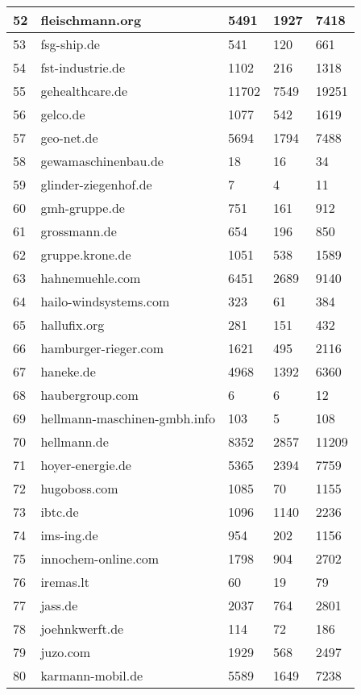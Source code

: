 \begin{longtable}{|m{0.5cm}|m{5cm}|m{2cm}|m{2cm}|m{2cm}|}
	52 & fleischmann.org & 5491 & 1927 & 7418\\
	\hline
	53 & fsg-ship.de & 541 & 120 & 661\\
	\hline
	54 & fst-industrie.de & 1102 & 216 & 1318\\
	\hline
	55 & gehealthcare.de & 11702 & 7549 & 19251\\
	\hline
	56 & gelco.de & 1077 & 542 & 1619\\
	\hline
	57 & geo-net.de & 5694 & 1794 & 7488\\
	\hline
	58 & gewamaschinenbau.de & 18 & 16 & 34\\
	\hline
	59 & glinder-ziegenhof.de & 7 & 4 & 11\\
	\hline
	60 & gmh-gruppe.de & 751 & 161 & 912\\
	\hline
	61 & grossmann.de & 654 & 196 & 850\\
	\hline
	62 & gruppe.krone.de & 1051 & 538 & 1589\\
	\hline
	63 & hahnemuehle.com & 6451 & 2689 & 9140\\
	\hline
	64 & hailo-windsystems.com & 323 & 61 & 384\\
	\hline
	65 & hallufix.org & 281 & 151 & 432\\
	\hline
	66 & hamburger-rieger.com & 1621 & 495 & 2116\\
	\hline
	67 & haneke.de & 4968 & 1392 & 6360\\
	\hline
	68 & haubergroup.com & 6 & 6 & 12\\
	\hline
	69 & hellmann-maschinen-gmbh.info & 103 & 5 & 108\\
	\hline
	70 & hellmann.de & 8352 & 2857 & 11209\\
	\hline
	71 & hoyer-energie.de & 5365 & 2394 & 7759\\
	\hline
	72 & hugoboss.com & 1085 & 70 & 1155\\
	\hline
	73 & ibtc.de & 1096 & 1140 & 2236\\
	\hline
	74 & ims-ing.de & 954 & 202 & 1156\\
	\hline
	75 & innochem-online.com & 1798 & 904 & 2702\\
	\hline
	76 & iremas.lt & 60 & 19 & 79\\
	\hline
	77 & jass.de & 2037 & 764 & 2801\\
	\hline
	78 & joehnkwerft.de & 114 & 72 & 186\\
	\hline
	79 & juzo.com & 1929 & 568 & 2497\\
	\hline
	80 & karmann-mobil.de & 5589 & 1649 & 7238\\
	\hline

\end{longtable}
